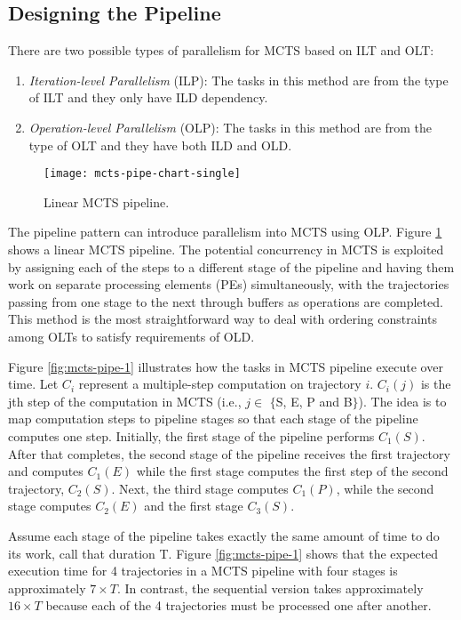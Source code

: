 \documentclass[10pt, conference, compsocconf]{IEEEtran}
\begin{document}
\subsection{Designing the Pipeline}
There are two possible types of parallelism for MCTS based on ILT and OLT:
\begin{enumerate}
\item \textit{Iteration-level Parallelism} (ILP): The tasks in this method are from the type of ILT and they only have ILD dependency. 

\item \textit{Operation-level Parallelism }(OLP): The tasks in this method are from the type of OLT and they have both ILD and OLD.

\end{enumerate}
\begin{figure}
\centering
\texttt{[image: mcts-pipe-chart-single]}
\caption{Linear MCTS pipeline.}
\label{fig:mcts-pipe}
\end{figure}

The pipeline pattern can introduce parallelism into MCTS using OLP. Figure \ref{fig:mcts-pipe} shows a linear MCTS pipeline. The potential concurrency in MCTS is exploited by assigning each of the steps to a different stage of the pipeline and having them work on separate processing elements (PEs) simultaneously, with the trajectories passing from one stage to the next through buffers as operations are completed. This method is the most straightforward way to deal with ordering constraints among OLTs to satisfy requirements of OLD.



Figure \ref{fig:mcts-pipe-1} illustrates how the tasks in MCTS pipeline execute over time. Let $C_{i}$ represent a multiple-step computation on trajectory $i$. $C_{i}(j)$ is the jth step of the computation in MCTS (i.e., $j \in$ $\lbrace$S, E, P and B$\rbrace$). The idea is to map computation steps to pipeline stages so that each stage of the pipeline computes one step. Initially, the first stage of the pipeline performs $C_{1}(S)$. After that completes, the second stage of the pipeline receives the first trajectory and computes $C_{1}(E)$ while the first stage computes the first step of the second trajectory, $C_{2}(S)$. Next, the third stage computes $C_{1}(P)$, while the second stage computes $C_{2}(E)$ and the first stage $C_{3}(S)$. 

Assume each stage of the pipeline takes exactly the same amount of time to do its work, call that duration T. Figure \ref{fig:mcts-pipe-1} shows that the expected execution time for 4 trajectories in a MCTS pipeline with four stages is approximately $7\times T$. In contrast, the sequential version takes approximately $16\times T$ because each of the 4 trajectories must be processed one after another.
\end{document}
